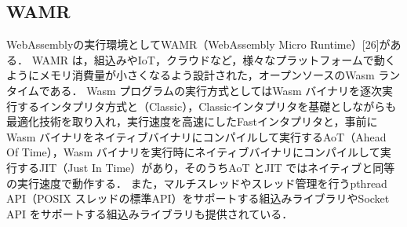 \subsection{WAMR}
WebAssemblyの実行環境としてWAMR（WebAssembly Micro Runtime）[26]がある．
WAMR は，組込みやIoT，クラウドなど，様々なプラットフォームで動くようにメモリ消費量が小さくなるよう設計された，オープンソースのWasm ランタイムである．
Wasm プログラムの実行方式としてはWasm バイナリを逐次実行するインタプリタ方式と（Classic），Classicインタプリタを基礎としながらも最適化技術を取り入れ，実行速度を高速にしたFastインタプリタと，事前にWasm バイナリをネイティブバイナリにコンパイルして実行するAoT（Ahead Of Time），Wasm バイナリを実行時にネイティブバイナリにコンパイルして実行するJIT（Just In Time）があり，そのうちAoT とJIT ではネイティブと同等の実行速度で動作する．
また，マルチスレッドやスレッド管理を行うpthread API（POSIX スレッドの標準API）をサポートする組込みライブラリやSocket API をサポートする組込みライブラリも提供されている．

